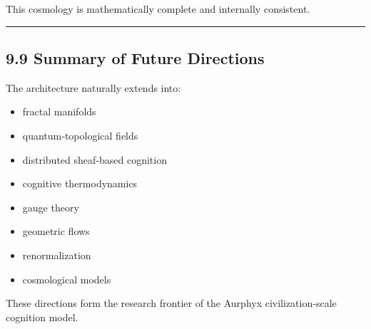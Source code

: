 This cosmology is mathematically complete and internally consistent.

\begin{center}\rule{0.5\linewidth}{0.5pt}\end{center}

\subsection{9.9 Summary of Future Directions}\label{summary-of-future-directions}

The architecture naturally extends into:

\begin{itemize}
\tightlist
\item
  fractal manifolds\\
\item
  quantum‑topological fields\\
\item
  distributed sheaf‑based cognition\\
\item
  cognitive thermodynamics\\
\item
  gauge theory\\
\item
  geometric flows\\
\item
  renormalization\\
\item
  cosmological models
\end{itemize}

These directions form the research frontier of the Aurphyx civilization‑scale cognition model.
